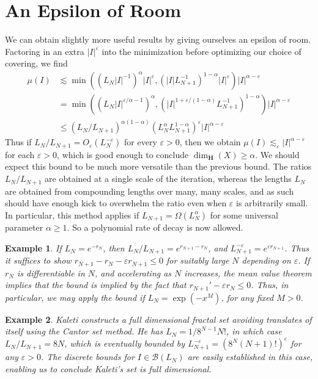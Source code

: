 \documentclass{report}
\theoremstyle{plain}
\newtheorem*{example}{Example}
\theoremstyle{plain}
\begin{document}
\section{An Epsilon of Room}

We can obtain slightly more useful results by giving ourselves an epsilon of room. Factoring in an extra $|I|^\varepsilon$ into the minimization before optimizing our choice of covering, we find
%
\begin{align*}
    \mu(I) &\lesssim \min\left( (L_N |I|^{-1})^\alpha |I|^\varepsilon, (|I| L_{N+1}^{-1})^{1 - \alpha} |I|^\varepsilon \right) |I|^{\alpha - \varepsilon}\\
    &= \min ( ( L_N |I|^{\varepsilon/\alpha - 1} )^\alpha, ( |I|^{1 + \varepsilon/(1 - \alpha)} L_{N+1}^{-1} )^{1-\alpha} ) |I|^{\alpha - \varepsilon}\\
    &\leq \left( L_N / L_{N+1} \right)^{\alpha(1-\alpha)} (L_N^\alpha L_{N+1}^{1-\alpha})^\varepsilon |I|^{\alpha - \varepsilon}
\end{align*}
%
Thus if $L_N/L_{N+1} = O_\varepsilon(L_N^{- \varepsilon})$ for every $\varepsilon > 0$, then we obtain $\mu(I) \lesssim_\varepsilon |I|^{\alpha - \varepsilon}$ for each $\varepsilon > 0$, which is good enough to conclude $\dim_{\mathbf{H}}(X) \geq \alpha$. We should expect this bound to be much more versatile than the previous bound. The ratios $L_N/L_{N+1}$ are obtained at a single scale of the iteration, whereas the lengths $L_N$ are obtained from compounding lengths over many, many scales, and as such should have enough kick to overwhelm the ratio even when $\varepsilon$ is arbitrarily small. In particular, this method applies if $L_{N+1} = \Omega(L_N^\alpha)$ for some universal parameter $\alpha \geq 1$. So a polynomial rate of decay is now allowed.

\begin{example}
    If $L_N = e^{-r_N}$, then $L_N/L_{N+1} = e^{r_{N+1} - r_N}$, and $L_{N+1}^{-\varepsilon} = e^{\varepsilon r_{N+1}}$. Thus it suffices to show $r_{N+1} - r_N - \varepsilon r_{N+1} \leq 0$ for suitably large $N$ depending on $\varepsilon$. If $r_N$ is differentiable in $N$, and accelerating as $N$ increases, the mean value theorem implies that the bound is implied by the fact that $r_{N+1}' - \varepsilon r_N \leq 0$. Thus, in particular, we may apply the bound if $L_N = \exp(-x^M)$, for any fixed $M > 0$.
\end{example}

\begin{example}
    Kaleti constructs a full dimensional fractal set avoiding translates of itself using the Cantor set method. He has $L_N = 1/8^{N-1}N!$, in which case $L_N/L_{N+1} = 8N$, which is eventually bounded by $L_{N+1}^{-\varepsilon} = (8^N (N+1)!)^\varepsilon$ for any $\varepsilon > 0$. The discrete bounds for $I \in \mathcal{B}(L_N)$ are easily established in this case, enabling us to conclude Kaleti's set is full dimensional.
\end{example}
\end{document}
